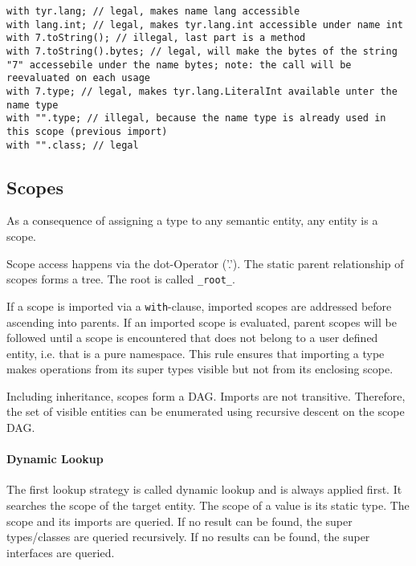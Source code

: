 \begin{lstlisting}[language=tyr]
with tyr.lang; // legal, makes name lang accessible
with lang.int; // legal, makes tyr.lang.int accessible under name int
with 7.toString(); // illegal, last part is a method
with 7.toString().bytes; // legal, will make the bytes of the string "7" accessebile under the name bytes; note: the call will be reevaluated on each usage
with 7.type; // legal, makes tyr.lang.LiteralInt available unter the name type
with "".type; // illegal, because the name type is already used in this scope (previous import)
with "".class; // legal
\end{lstlisting}


\subsection{Scopes}

As a consequence of assigning a type to any semantic entity, any entity is a scope.

Scope access happens via the dot-Operator ('.').
The static parent relationship of scopes forms a tree.
The root is called \texttt{\_root\_}.

If a scope is imported via a \texttt{with}-clause, imported scopes are addressed before ascending into parents.
If an imported scope is evaluated, parent scopes will be followed until a scope is encountered that does not belong to a user defined entity, i.e. that is a pure namespace.
This rule ensures that importing a type makes operations from its super types visible but not from its enclosing scope.

Including inheritance, scopes form a DAG.
Imports are not transitive.
Therefore, the set of visible entities can be enumerated using recursive descent on the scope DAG.


\paragraph{Dynamic Lookup} The first lookup strategy is called dynamic lookup and is always applied first.
It searches the scope of the target entity.
The scope of a value is its static type.
The scope and its imports are queried.
If no result can be found, the super types/classes are queried recursively.
If no results can be found, the super interfaces are queried.


